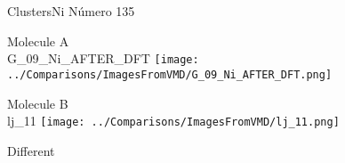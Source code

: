 \vtab[-3cm]
\begin{center}
{\large ClustersNi \tab Número 135}
\end{center}
\begin{multicols}{2}
\begin{center}
Molecule A \\ 
G\_09\_Ni\_AFTER\_DFT
\texttt{[image: ../Comparisons/ImagesFromVMD/G\_09\_Ni\_AFTER\_DFT.png]}
\\
\vtab

\columnbreak
Molecule B \\ 
lj\_11
\texttt{[image: ../Comparisons/ImagesFromVMD/lj\_11.png]}
\\
\vtab


\end{center}
\end{multicols}
\begin{center}
\textcolor{NavyBlue}{\Large Different}
\end{center}

 \newpage

